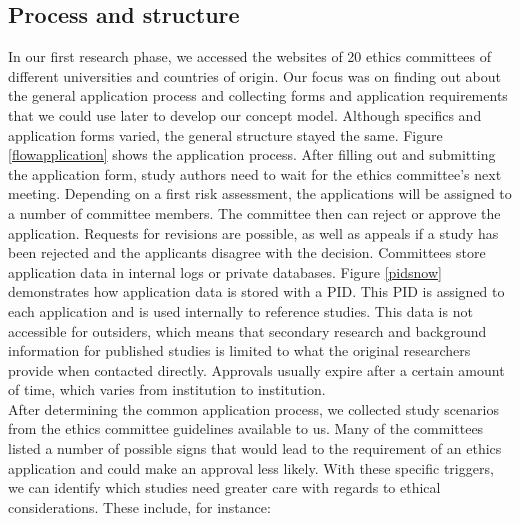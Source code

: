 \documentclass[10pt]{article}
\begin{document}
\subsection{Process and structure}
In our first research phase, we accessed the websites of 20 ethics committees of different universities and countries of origin. Our focus was on finding out about the general application process and collecting forms and application requirements that we could use later to develop our concept model. Although specifics and application forms varied, the general structure stayed the same. Figure \ref{flowapplication} shows the application process. After filling out and submitting the application form, study authors need to wait for the ethics committee's next meeting. Depending on a first risk assessment, the applications will be assigned to a number of committee members. The committee then can reject or approve the application. Requests for revisions are possible, as well as appeals if a study has been rejected and the applicants disagree with the decision. Committees store application data in internal logs or private databases. Figure \ref{pidsnow} demonstrates how application data is stored with a PID. This PID is assigned to each application and is used internally to reference studies. This data is not accessible for outsiders, which means that secondary research and background information for published studies is limited to what the original researchers provide when contacted directly. Approvals usually expire after a certain amount of time, which varies from institution to institution.\\

After determining the common application process, we collected study scenarios from the ethics committee guidelines available to us. Many of the committees listed a number of possible signs that would lead to the requirement of an ethics application and could make an approval less likely. With these specific triggers, we can identify which studies need greater care with regards to ethical considerations. These include, for instance:
\end{document}
